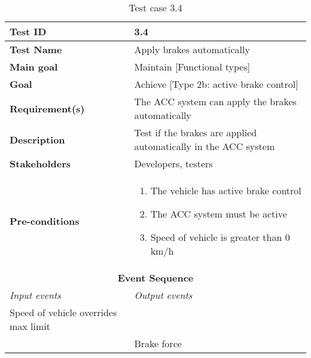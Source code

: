 \begin{table}[H]
\centering
\begin{tabularx}{\linewidth}{X|X}
  \hline
  \textbf{Test ID} & 3.4\\
  \hline
  \textbf{Test Name} &  Apply brakes automatically\\
  \hline
  \textbf{Main goal} &  Maintain [Functional types]\\
  \hline
  \textbf{Goal} & Achieve [Type 2b: active brake control] \\
  \hline
  \textbf{Requirement(s)} &  The ACC system can apply the brakes automatically\\
  \hline
  \textbf{Description} &  Test if the brakes are applied automatically in the ACC system\\
  \hline
  \textbf{Stakeholders} &  Developers, testers\\
  \hline
  \textbf{Pre-conditions} &  
  \begin{enumerate}
      \item The vehicle has active brake control
      \item The ACC system must be active
      \item Speed of vehicle is greater than 0 km/h
  \end{enumerate}\\
  \hline
  \multicolumn{2}{c}{\textbf{Event Sequence}} \\
  \hline
  \textit{Input events} & \textit{Output events} \\
  \hline
   Speed of vehicle overrides max limit &  \\
  \hline
    & Brake force \\
  \hline
  \end{tabularx}
\caption{\label{tab_caseX} Test case 3.4}
\end{table}



